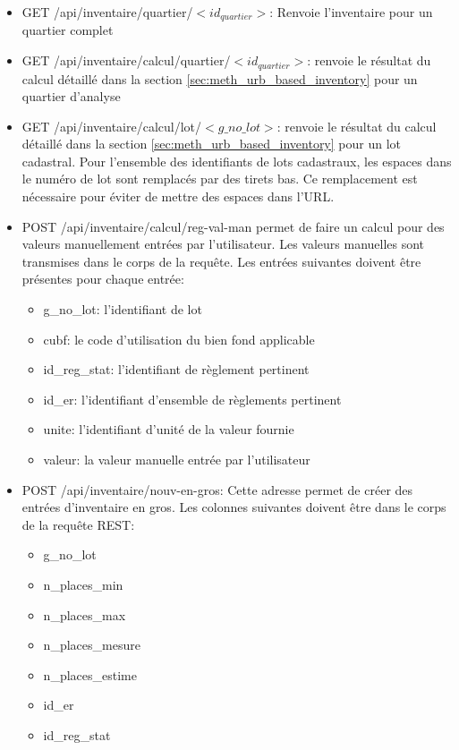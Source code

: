 \begin{itemize}
    \item GET /api/inventaire/quartier/$<id_{quartier}>$: Renvoie l'inventaire pour un quartier complet
    \item GET /api/inventaire/calcul/quartier/$<id_{quartier}>$: renvoie le résultat du calcul détaillé dans la section \ref{sec:meth_urb_based_inventory} pour un quartier d'analyse
    \item GET /api/inventaire/calcul/lot/$<g\_no\_lot>$: renvoie le résultat du calcul détaillé dans la section \ref{sec:meth_urb_based_inventory} pour un lot cadastral. Pour l'ensemble des identifiants de lots cadastraux, les espaces dans le numéro de lot sont remplacés par des tirets bas. Ce remplacement est nécessaire pour éviter de mettre des espaces dans l'\ac{URL}.
    \item POST /api/inventaire/calcul/reg-val-man permet de faire un calcul pour des valeurs manuellement entrées par l'utilisateur. Les valeurs manuelles sont transmises dans le corps de la requête. Les entrées suivantes doivent être présentes pour chaque entrée:
    \begin{itemize}
        \item g\_no\_lot: l'identifiant de lot
        \item cubf: le code d'utilisation du bien fond applicable
        \item id\_reg\_stat: l'identifiant de règlement pertinent
        \item id\_er: l'identifiant d'ensemble de règlements pertinent
        \item unite: l'identifiant d'unité de la valeur fournie
        \item valeur: la valeur manuelle entrée par l'utilisateur
    \end{itemize}
    \item POST /api/inventaire/nouv-en-gros: Cette adresse permet de créer des entrées d'inventaire en gros. Les colonnes suivantes doivent être dans le corps de la requête \ac{REST}:
    \begin{itemize}
        \item g\_no\_lot
        \item n\_places\_min
        \item n\_places\_max
        \item n\_places\_mesure
        \item n\_places\_estime
        \item id\_er
        \item id\_reg\_stat

\end{itemize}
\end{itemize}
